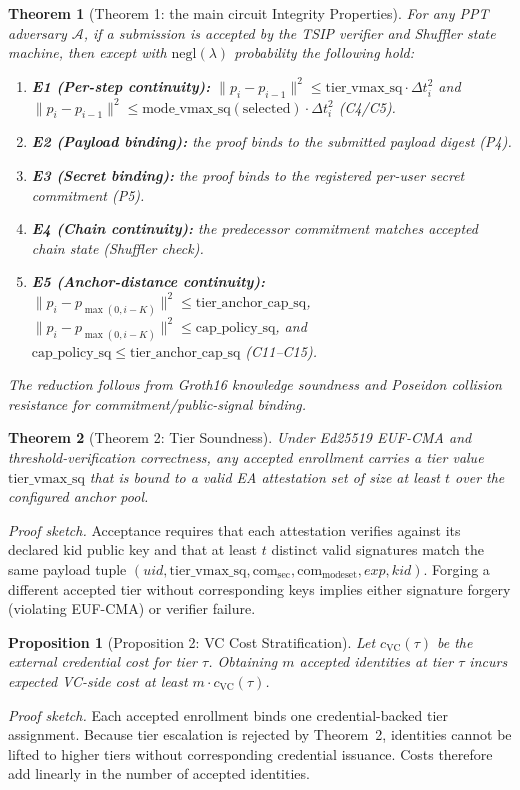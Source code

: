 \documentclass[conference]{IEEEtran}
\theoremstyle{definition}
\theoremstyle{plain}
\newtheorem{theorem}{Theorem}
\newtheorem{proposition}{Proposition}
\begin{document}
\begin{theorem}[Theorem 1: the main circuit Integrity Properties]
For any PPT adversary $\mathcal{A}$, if a submission is accepted by the
TSIP verifier and Shuffler state machine, then except with
$\mathrm{negl}(\lambda)$ probability the following hold:
\begin{enumerate}
\item \textbf{E1 (Per-step continuity):}
$\|p_i-p_{i-1}\|^2 \le \mathrm{tier\_vmax\_sq}\cdot\Delta t_i^2$
and
$\|p_i-p_{i-1}\|^2 \le \mathrm{mode\_vmax\_sq(selected)}\cdot\Delta t_i^2$
(C4/C5).
\item \textbf{E2 (Payload binding):}
the proof binds to the submitted payload digest (P4).
\item \textbf{E3 (Secret binding):}
the proof binds to the registered per-user secret commitment (P5).
\item \textbf{E4 (Chain continuity):}
the predecessor commitment matches accepted chain state (Shuffler check).
\item \textbf{E5 (Anchor-distance continuity):}
$\|p_i-p_{\max(0,i-K)}\|^2 \le \mathrm{tier\_anchor\_cap\_sq}$,
$\|p_i-p_{\max(0,i-K)}\|^2 \le \mathrm{cap\_policy\_sq}$,
and $\mathrm{cap\_policy\_sq}\le\mathrm{tier\_anchor\_cap\_sq}$ (C11--C15).
\end{enumerate}
The reduction follows from Groth16 knowledge soundness and Poseidon
collision resistance for commitment/public-signal binding.
\end{theorem}

\begin{theorem}[Theorem 2: Tier Soundness]
Under Ed25519 EUF-CMA and threshold-verification correctness, any accepted
enrollment carries a tier value $\mathrm{tier\_vmax\_sq}$ that is bound to a
valid EA attestation set of size at least $t$ over the configured anchor pool.
\end{theorem}
\textit{Proof sketch.}
Acceptance requires that each attestation verifies against its declared
kid public key and that at least $t$ distinct valid signatures match
the same payload tuple
$(uid,\mathrm{tier\_vmax\_sq},\mathrm{com}_{\mathrm{sec}},\mathrm{com}_{\mathrm{modeset}},exp,kid)$.
Forging a different accepted tier without corresponding keys implies either
signature forgery (violating EUF-CMA) or verifier failure.

\begin{proposition}[Proposition 2: VC Cost Stratification]
Let $c_{\mathrm{VC}}(\tau)$ be the external credential cost for tier $\tau$.
Obtaining $m$ accepted identities at tier $\tau$ incurs expected VC-side cost
at least $m\cdot c_{\mathrm{VC}}(\tau)$.
\end{proposition}
\textit{Proof sketch.}
Each accepted enrollment binds one credential-backed tier assignment.
Because tier escalation is rejected by Theorem~2, identities cannot be lifted
to higher tiers without corresponding credential issuance. Costs therefore add
linearly in the number of accepted identities.
\end{document}
